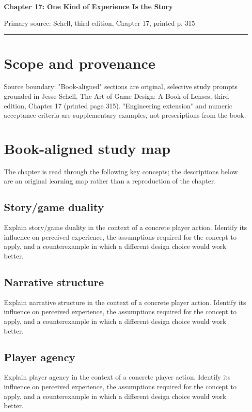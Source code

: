\documentclass[11pt]{article}
\begin{document}
{\huge\bfseries\color{suiteblue} Chapter 17: One Kind of Experience Is the Story}\par
\vspace{0.15in}
{\normalsize\color{suitegray} Primary source: Schell, third edition, Chapter 17, printed p. 315}\par
\vspace{0.15in}\hrule\vspace{0.15in}

\section{Scope and provenance}
Source boundary: "Book-aligned" sections are original, selective study prompts grounded in Jesse Schell, The Art of Game Design: A Book of Lenses, third edition, Chapter 17 (printed page 315). "Engineering extension" and numeric acceptance criteria are supplementary examples, not prescriptions from the book.


\section{Book-aligned study map}
The chapter is read through the following key concepts; the descriptions below are an original learning map rather than a reproduction of the chapter.


\subsection{Story/game duality}
Explain story/game duality in the context of a concrete player action. Identify its influence on perceived experience, the assumptions required for the concept to apply, and a counterexample in which a different design choice would work better.


\subsection{Narrative structure}
Explain narrative structure in the context of a concrete player action. Identify its influence on perceived experience, the assumptions required for the concept to apply, and a counterexample in which a different design choice would work better.


\subsection{Player agency}
Explain player agency in the context of a concrete player action. Identify its influence on perceived experience, the assumptions required for the concept to apply, and a counterexample in which a different design choice would work better.
\end{document}
